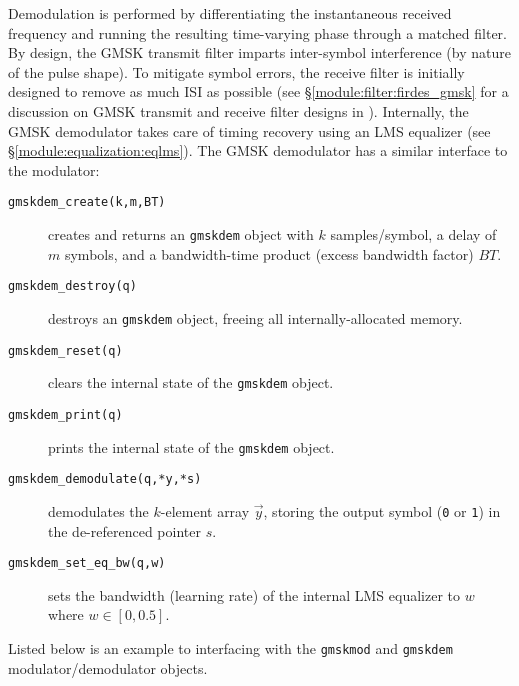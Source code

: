 Demodulation is performed by differentiating the instantaneous received
frequency and running the resulting time-varying phase through a matched
filter.
By design, the GMSK transmit filter imparts inter-symbol interference
(by nature of the pulse shape).
To mitigate symbol errors, the receive filter is initially designed to
remove as much ISI as possible
(see \S\ref{module:filter:firdes_gmsk} for a discussion on GMSK transmit
and receive filter designs in \liquid).
Internally, the GMSK demodulator takes care of timing recovery using an
LMS equalizer (see \S\ref{module:equalization:eqlms}).
The GMSK demodulator has a similar interface to the modulator:
%
\begin{description}
\item[{\tt gmskdem\_create(k,m,BT)}]
    creates and returns an {\tt gmskdem} object with
    $k$ samples/symbol,
    a delay of $m$ symbols,
    and a bandwidth-time product (excess bandwidth factor) $BT$.
\item[{\tt gmskdem\_destroy(q)}]
    destroys an {\tt gmskdem} object, freeing all internally-allocated
    memory.
\item[{\tt gmskdem\_reset(q)}]
    clears the internal state of the {\tt gmskdem} object.
\item[{\tt gmskdem\_print(q)}]
    prints the internal state of the {\tt gmskdem} object.
\item[{\tt gmskdem\_demodulate(q,*y,*s)}]
    demodulates the $k$-element array $\vec{y}$, storing the output
    symbol ({\tt 0} or {\tt 1}) in the de-referenced pointer $s$.
\item[{\tt gmskdem\_set\_eq\_bw(q,w)}]
    sets the bandwidth (learning rate) of the internal LMS equalizer to
    $w$ where $w \in [0,0.5]$.
\end{description}


Listed below is an example to interfacing with the {\tt gmskmod} and
{\tt gmskdem} modulator/demodulator objects.
%

%
